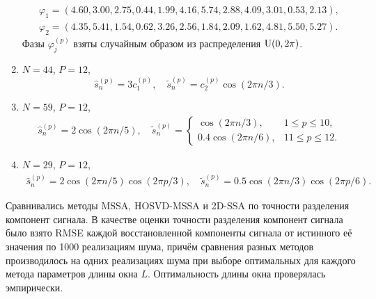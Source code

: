\documentclass[specialist,
    substylefile = spbu_report.rtx,
    subf,href,colorlinks=true, 12pt]{disser}
\theoremstyle{plain}
\theoremstyle{definition}
\theoremstyle{remark}
\begin{document}
\begin{enumerate}
\begin{gather}
               \label{eq:sep-rand-phase}\\
               \varphi_1 = \left(4.60, 3.00, 2.75, 0.44, 1.99, 4.16, 5.74, 2.88, 4.09, 3.01, 0.53, 2.13\right),\nonumber\\
               \varphi_2 = \left(4.35, 5.41, 1.54, 0.62, 3.26, 2.56, 1.84, 2.09, 1.62, 4.81, 5.50, 5.27\right). \nonumber
        \end{gather}
        Фазы $\varphi_j^{(p)}$ взяты случайным образом из распределения $\mathrm{U}(0, 2\pi)$.
        \item $N = 44$, $P = 12$,
        \begin{equation}
            \hat{s}_n^{(p)} = 3 c_1^{(p)}, 
            \quad \tilde{s}_n^{(p)} = c_2^{(p)}\cos(2\pi n /3).
            \label{eq:sep-const-cos}
        \end{equation}
        \item $N = 59$, $P = 12$,
        \begin{gather}
            \hat{s}_n^{(p)} = 2 \cos(2 \pi n / 5), \quad 
            \tilde{s}_n^{(p)} = \begin{cases}
                \cos(2\pi n /3), & 1 \leqslant p \leqslant 10,\\
                0.4 \cos(2 \pi n / 6), & 11 \leqslant p \leqslant 12.
            \end{cases}
            \label{eq:sep-periods}
        \end{gather}
        \item $N = 29$, $P = 12$,
        \begin{gather}
            \hat{s}_n^{(p)} = 2 \cos(2 \pi n / 5) \cos(2 \pi p / 3), \quad 
            \tilde{s}_n^{(p)} = 0.5 \cos(2\pi n /3) \cos(2 \pi p / 6).
            \label{eq:sep-orthogonal-3}
        \end{gather}
    \end{enumerate}
    
    Сравнивались методы MSSA, HOSVD-MSSA и 2D-SSA по точности разделения компонент сигнала. 
    В качестве оценки точности разделения компонент сигнала было взято RMSE
    каждой восстановленной компоненты сигнала от истинного её значения по 1000 реализациям шума,
    причём сравнения разных методов производилось на одних реализациях шума при выборе оптимальных
    для каждого метода параметров длины окна $L$.
    Оптимальность длины окна проверялась эмпирически.
    
    
\end{document}
